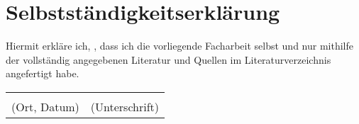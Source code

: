 \section{Selbstständigkeitserklärung}

Hiermit erkläre ich, \underline{\hspace{5cm}}, dass ich die vorliegende Facharbeit selbst und nur mithilfe 
der vollständig angegebenen Literatur und Quellen im Literaturverzeichnis angefertigt habe.

\vspace{2.5cm}

\begin{tabular}{ll}
    \centering
    \underline{\hspace{6cm}}&\underline{\hspace{6cm}}\\
    (Ort, Datum)&(Unterschrift)\\ 
\end{tabular}
